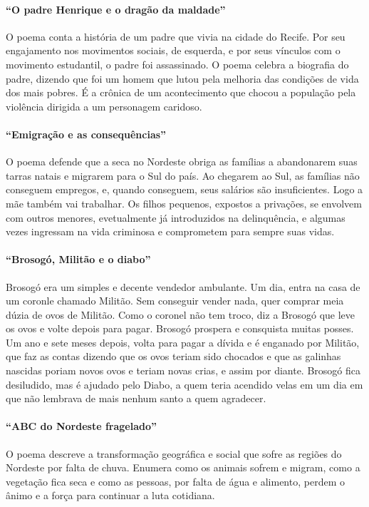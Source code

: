 \documentclass[11pt]{hedrabook_ficha}
\begin{document}
\paragraph{“O padre Henrique e o dragão da maldade”} O poema conta a história
de um padre que vivia na cidade do Recife. Por seu engajamento nos movimentos
sociais, de esquerda, e por seus vínculos com o movimento estudantil, o padre
foi assassinado. O poema celebra a biografia do padre, dizendo que foi um homem
que lutou pela melhoria das condições de vida dos mais pobres. É a crônica de
um acontecimento que chocou a população pela violência dirigida a um personagem
caridoso.

\paragraph{“Emigração e as consequências”} O poema defende que a seca no
Nordeste obriga as famílias a abandonarem suas tarras natais e migrarem para o
Sul do país. Ao chegarem ao Sul, as famílias não conseguem empregos, e, quando
conseguem, seus salários são insuficientes. Logo a mãe também vai trabalhar. Os
filhos pequenos, expostos a privações, se envolvem com outros menores,
evetualmente já introduzidos na delinquência, e algumas vezes ingressam na vida
criminosa e comprometem para sempre suas vidas.

\paragraph{“Brosogó, Militão e o diabo”} Brosogó era um simples e decente
vendedor ambulante. Um dia, entra na casa de um coronle chamado Militão. Sem
conseguir vender nada, quer comprar meia dúzia de ovos de Militão. Como o
coronel não tem troco, diz a Brosogó que leve os ovos e volte depois para
pagar. Brosogó prospera e consquista muitas posses. Um ano e sete meses depois,
volta para pagar a dívida e é enganado por Militão, que faz as contas dizendo
que os ovos teriam sido chocados e que as galinhas nascidas poriam novos ovos e
teriam novas crias, e assim por diante. Brosogó fica desiludido, mas é ajudado
pelo Diabo, a quem teria acendido velas em um dia em que não lembrava de mais
nenhum santo a quem agradecer. 

\paragraph{“ABC do Nordeste fragelado”} O poema descreve a transformação
geográfica e social que sofre as regiões do Nordeste por falta de chuva.
Enumera como os animais sofrem e migram, como a vegetação fica seca e como as
pessoas, por falta de água e alimento, perdem o ânimo e a força para continuar
a luta cotidiana. 
\end{document}
